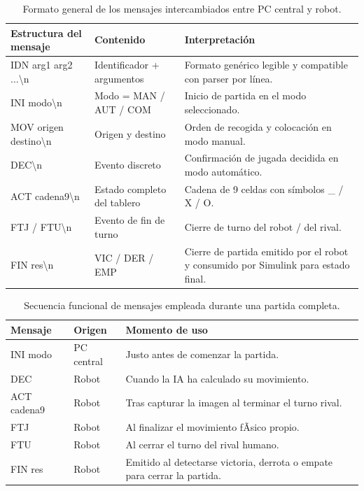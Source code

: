 \documentclass[12pt,a4paper]{article}
\begin{document}
\begin{table}[H]
\centering
\footnotesize
\begin{tabular}{P{0.25\textwidth} P{0.26\textwidth} P{0.39\textwidth}}
\toprule
\textbf{Estructura del mensaje} & \textbf{Contenido} & \textbf{Interpretaci\'on} \\
\midrule
IDN arg1 arg2 ...\textbackslash n & Identificador + argumentos & Formato gen\'erico legible y compatible con parser por l\'inea. \\
INI modo\textbackslash n & Modo = MAN / AUT / COM & Inicio de partida en el modo seleccionado. \\
MOV origen destino\textbackslash n & Origen y destino & Orden de recogida y colocaci\'on en modo manual. \\
DEC\textbackslash n & Evento discreto & Confirmaci\'on de jugada decidida en modo autom\'atico. \\
ACT cadena9\textbackslash n & Estado completo del tablero & Cadena de 9 celdas con s\'imbolos \_ / X / O. \\
FTJ / FTU\textbackslash n & Evento de fin de turno & Cierre de turno del robot / del rival. \\
FIN res\textbackslash n & VIC / DER / EMP & Cierre de partida emitido por el robot y consumido por Simulink para estado final. \\
\bottomrule
\end{tabular}
\caption{Formato general de los mensajes intercambiados entre PC central y robot.}
\end{table}

\begin{table}[H]
\centering
\footnotesize
\begin{tabular}{P{0.22\textwidth} P{0.26\textwidth} P{0.42\textwidth}}
\toprule
\textbf{Mensaje} & \textbf{Origen} & \textbf{Momento de uso} \\
\midrule
INI modo & PC central & Justo antes de comenzar la partida. \\
DEC & Robot & Cuando la IA ha calculado su movimiento. \\
ACT cadena9 & Robot & Tras capturar la imagen al terminar el turno rival. \\
FTJ & Robot & Al finalizar el movimiento fÃ­sico propio. \\
FTU & Robot & Al cerrar el turno del rival humano. \\
FIN res & Robot & Emitido al detectarse victoria, derrota o empate para cerrar la partida. \\
\bottomrule
\end{tabular}
\caption{Secuencia funcional de mensajes empleada durante una partida completa.}
\end{table}
\end{document}
